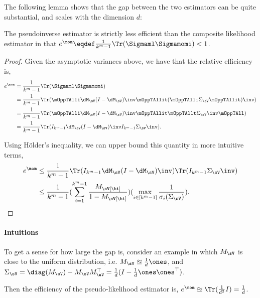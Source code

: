 The following lemma shows that the gap between the two estimators can be quite substantial,
and scales with the dimension $d$: %
\begin{corollary}
The pseudoinverse estimator is strictly less efficient
than the composite likelihood estimator in that $e^\mom \eqdef \frac{1}{k^m-1} \Tr(\Sigmaml\Sigmamomi ) < 1$.
\end{corollary}
\begin{proof}
  Given the asymptotic variances above, we have that the relative efficiency is,
  \begin{align*}
    e^\mom
    &= \frac{1}{k^m-1} \Tr(\Sigmaml \Sigmamomi) \\
    &= \frac{1}{k^m-1} \Tr( \mOppTAlli \dM_\sV (I - \dM_\sV)\inv \mOppTAllit (\mOppTAlli \Sigma_\sV \mOppTAllit)\inv )  \\
    &= \frac{1}{k^m-1} \Tr( \mOppTAlli \dM_\sV (I - \dM_\sV)\inv \mOppTAllit \mOppTAllt \Sigma_\sV\inv \mOppTAll ) \\ 
    &= \frac{1}{k^m-1} \Tr( I_{k^m-1}  \dM_\sV (I - \dM_\sV)\inv   I_{k^m-1} \Sigma_\sV\inv ).
  \end{align*}

  Using H\"{o}lder's inequality, we can upper bound this quantity in more intuitive terms,
  \begin{align*}
    e^\mom
    &\le \frac{1}{k^m-1} \Tr(I_{k^m-1} \dM_\sV (I - \dM_\sV)\inv ) \Tr(I_{k^m-1} \Sigma_\sV\inv) \\ 
    &\le \frac{1}{k^m-1}(\sum_{i=1}^{k^m-1} \frac{ M_\sV[\bi] }{ 1 - M_\sV[\bi]}) 
      (\max_{i \in [k^m-1]}  \frac{1}{\sigma_{i}(\Sigma_\sV)}).
  \end{align*}

\end{proof}

\paragraph{Intuitions}
To get a sense for how large the gap is, consider an example in which
$M_\sV$ is close to the uniform distribution, i.e. $M_\sV
\approxeq \frac{1}{d} \ones$, and $\Sigma_\sV = \diag(M_\sV) - M_\sV
M_\sV^\top = \frac{1}{d}(I - \frac{1}{d} \ones \ones^\top)$.

Then the efficiency of the pseudo-likelihood estimator is,
$e^\mom \approxeq \Tr(\frac{1}{d^2} I) = \frac{1}{d}$.

